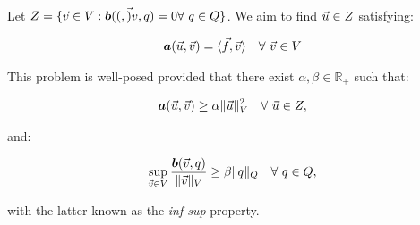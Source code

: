 Let $Z = \{\vec{v} \in V: \bm{b}((, \vec{)}{v}, q) = 0 \forall ~ q \in Q\}$. We aim to find $\vec{u} \in Z$ satisfying:

\begin{gather} \label{kernel_stokes}
    \bm{a}(\vec{u}, \vec{v}) = \langle \vec{f}, \vec{v} \rangle \quad \forall ~ \vec{v} \in V
\end{gather}

This problem is well-posed provided that there exist $\alpha, \beta \in \mathbb{R}_+$ such that:

\begin{gather} \label{coercivity}
    \bm{a}(\vec{u}, \vec{v}) \geq \alpha \lVert \vec{u} \rVert^2_V \quad \forall ~ \vec{u} \in Z,
\end{gather}

and:

\begin{gather} \label{inf-sup}
    \sup_{\vec{v} \in V} \frac{\bm{b}(\vec{v}, q)}{\lVert \vec{v} \rVert_V} \geq \beta \lVert q \rVert_Q \quad \forall ~ q \in Q,
\end{gather}

with the latter known as the \textit{inf-sup} property.